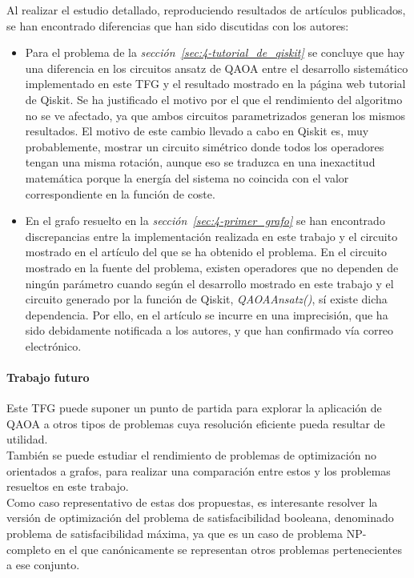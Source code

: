 Al realizar el estudio detallado, reproduciendo resultados de artículos publicados, se han encontrado diferencias que han sido discutidas con los autores:

\begin{itemize}
\item Para el problema de la \textit{sección~\ref{sec:4-tutorial_de_qiskit}} se concluye que hay una diferencia en los circuitos ansatz de QAOA entre el desarrollo sistemático implementado en este TFG y el resultado mostrado en la página web tutorial de Qiskit\cite{qiskit_tutorial_antiguo}.
  Se ha justificado el motivo por el que el rendimiento del algoritmo no se ve afectado, ya que ambos circuitos parametrizados generan los mismos resultados.
  El motivo de este cambio llevado a cabo en Qiskit es, muy probablemente, mostrar un circuito simétrico donde todos los operadores tengan una misma rotación, aunque eso se traduzca en una inexactitud matemática porque la energía del sistema no coincida con el valor correspondiente en la función de coste.

\item En el grafo resuelto en la \textit{sección~\ref{sec:4-primer_grafo}} se han encontrado discrepancias entre la implementación realizada en este trabajo y el circuito mostrado en el artículo\cite{multi-objective_routing_optimization} del que se ha obtenido el problema.
  En el circuito mostrado en la fuente del problema, existen operadores que no dependen de ningún parámetro cuando según el desarrollo mostrado en este trabajo y el circuito generado por la función de Qiskit, \textit{QAOAAnsatz()}, sí existe dicha dependencia.
  Por ello, en el artículo se incurre en una imprecisión, que ha sido debidamente notificada a los autores, y que han confirmado vía correo electrónico.
\end{itemize}


\paragraph{Trabajo futuro}
Este TFG puede suponer un punto de partida para explorar la aplicación de QAOA a otros tipos de problemas cuya resolución eficiente pueda resultar de utilidad.
\\
También se puede estudiar el rendimiento de problemas de optimización no orientados a grafos, para realizar una comparación entre estos y los problemas resueltos en este trabajo.
\\
Como caso representativo de estas dos propuestas, es interesante resolver la versión de optimización del problema de satisfacibilidad booleana, denominado problema de satisfacibilidad máxima, ya que es un caso de problema NP-completo en el que canónicamente se representan otros problemas pertenecientes a ese conjunto.

